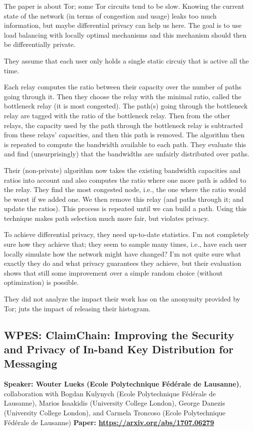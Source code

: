 \documentclass{article}
\begin{document}
The paper is about Tor; some Tor circuits tend to be slow. Knowing the current state of the network (in terms of congestion and usage) leaks too much information, but maybe differential privacy can help us here. The goal is to use load balancing with locally optimal mechanisms and this mechanism should then be differentially private.

They assume that each user only holds a single static circuiy that is active all the time. 

Each relay computes the ratio between their capacity over the number of paths going through it. Then they choose the relay with the minimal ratio, called the bottleneck relay (it is most congested). The path(s) going through the bottleneck relay are tagged with the ratio of the bottleneck relay. Then from the other relays, the capacity used by the path through the bottleneck relay is subtracted from these relays' capacities, and then this path is removed. The algorithm then is repeated to compute the bandwidth available to each path. They evaluate this and find (unsurprisingly) that the bandwidths are unfairly distributed over paths.

Their (non-private) algorithm now takes the existing bandwidth capacities and ratios into account and also computes the ratio where one more path is added to the relay. They find the most congested node, i.e., the one where the ratio would be worst if we added one. We then remove this relay (and paths through it; and update the ratios). This process is repeated until we can build a path. Using this technique makes path selection much more fair, but violates privacy.

To achieve differential privacy, they need up-to-date statistics. I'm not completely sure how they achieve that; they seem to sample many times, i.e., have each user locally simulate how the network might have changed? I'm not quite sure what exactly they do and what privacy guarantees they achieve, but their evaluation shows that still some improvement over a simple random choice (without optimization) is possible.

They did not analyze the impact their work has on the anonymity provided by Tor; juts the impact of releasing their histogram.


\subsection{WPES: ClaimChain: Improving the Security and Privacy of In-band Key Distribution for Messaging}
\noindent\textbf{Speaker: Wouter Lueks (Ecole Polytechnique Fédérale de Lausanne)}, collaboration with Bogdan Kulynych (Ecole Polytechnique Fédérale de Lausanne), Marios Isaakidis (University College London), George Danezis (University College London), and Carmela Troncoso (Ecole Polytechnique Fédérale de Lausanne) 
\noindent\textbf{Paper: \url{https://arxiv.org/abs/1707.06279}}
\end{document}
